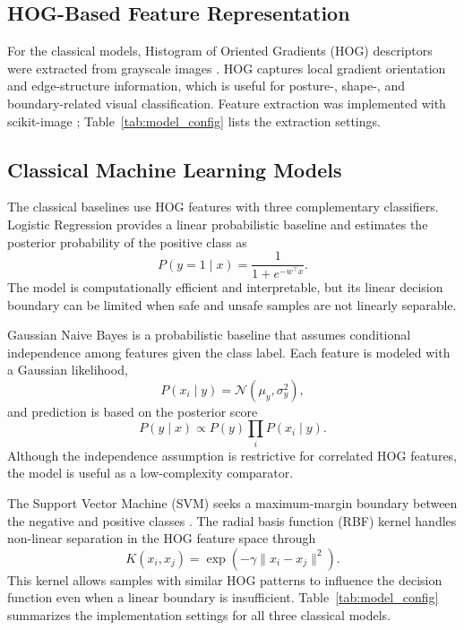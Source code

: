 \documentclass[conference]{IEEEtran}
\begin{document}
\subsection{HOG-Based Feature Representation}
For the classical models, Histogram of Oriented Gradients (HOG) descriptors were extracted from grayscale images \cite{dalal2005hog}. HOG captures local gradient orientation and edge-structure information, which is useful for posture-, shape-, and boundary-related visual classification. Feature extraction was implemented with scikit-image \cite{vanderwalt2014skimage}; Table~\ref{tab:model_config} lists the extraction settings.

\subsection{Classical Machine Learning Models}
The classical baselines use HOG features with three complementary classifiers. Logistic Regression provides a linear probabilistic baseline and estimates the posterior probability of the positive class as
\[
P(y=1 \mid x) = \frac{1}{1 + e^{-w^{\top} x}} .
\]
The model is computationally efficient and interpretable, but its linear decision boundary can be limited when safe and unsafe samples are not linearly separable.

Gaussian Naive Bayes is a probabilistic baseline that assumes conditional independence among features given the class label. Each feature is modeled with a Gaussian likelihood,
\[
P(x_i \mid y) = \mathcal{N}(\mu_y, \sigma_y^2),
\]
and prediction is based on the posterior score
\[
P(y \mid x) \propto P(y) \prod_i P(x_i \mid y).
\]
Although the independence assumption is restrictive for correlated HOG features, the model is useful as a low-complexity comparator.

The Support Vector Machine (SVM) seeks a maximum-margin boundary between the negative and positive classes \cite{cortes1995svm}. The radial basis function (RBF) kernel handles non-linear separation in the HOG feature space through
\[
K(x_i, x_j) = \exp\!\left(-\gamma \lVert x_i - x_j \rVert^2\right).
\]
This kernel allows samples with similar HOG patterns to influence the decision function even when a linear boundary is insufficient. Table~\ref{tab:model_config} summarizes the implementation settings for all three classical models.
\end{document}

